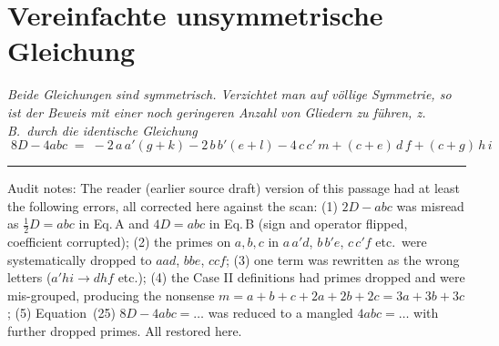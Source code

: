 \documentclass[11pt]{article}
\begin{document}
\section*{Vereinfachte unsymmetrische Gleichung}

\emph{Beide Gleichungen sind symmetrisch. Verzichtet man auf völlige Symmetrie,
so ist der Beweis mit einer noch geringeren Anzahl von Gliedern zu führen, z.\,B.\
durch die identische Gleichung}
\[
\boxed{\;8D-4abc \;=\; -2\,a\,a'(g+k)-2\,b\,b'(e+l)-4\,c\,c'\,m+(c+e)\,d\,f+(c+g)\,h\,i\;}
\]

\bigskip
\hrule\medskip
\noindent\footnotesize Audit notes: The reader (earlier source draft) version of this passage
had at least the following errors, all corrected here against the scan:
(1) $2D-abc$ was misread as $\tfrac12 D=abc$ in Eq.\,A and $4D=abc$ in Eq.\,B
    (sign and operator flipped, coefficient corrupted);
(2) the primes on $a,b,c$ in $a\,a'd$, $b\,b'e$, $c\,c'f$ etc.\ were systematically
    dropped to $aad$, $bbe$, $ccf$;
(3) one term was rewritten as the wrong letters ($a'hi\to dhf$ etc.);
(4) the Case II definitions had primes dropped and were mis-grouped, producing
    the nonsense $m=a+b+c+2a+2b+2c=3a+3b+3c$;
(5) Equation~(25) $8D-4abc=\dots$ was reduced to a mangled $4abc=\dots$ with
    further dropped primes. All restored here.
\end{document}
